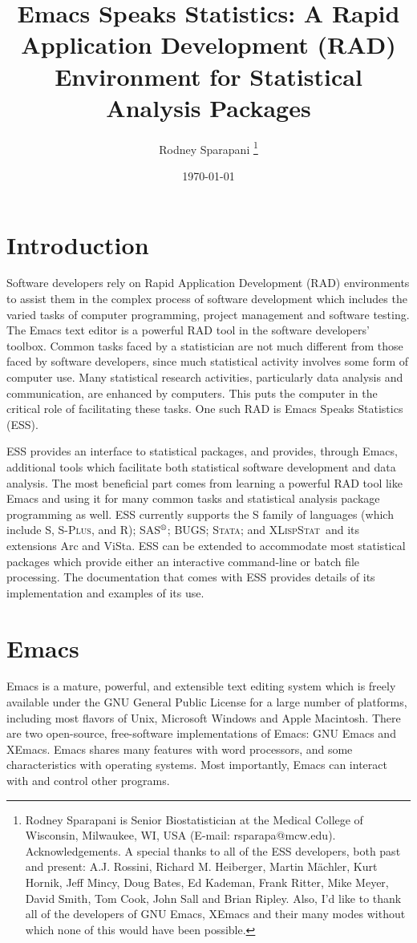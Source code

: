 \documentclass{article}
\title{Emacs Speaks Statistics:  A Rapid Application Development (RAD)
  Environment for Statistical Analysis Packages}
\author{Rodney Sparapani \footnote{%
Rodney Sparapani is Senior Biostatistician at the Medical College
of Wisconsin, Milwaukee, WI, USA (E-mail: rsparapa@mcw.edu).
Acknowledgements.  A special thanks to all of the ESS developers, both past
    and present:  A.J. Rossini, Richard M. Heiberger, Martin M{\"a}chler, 
    Kurt Hornik, Jeff Mincy, Doug Bates, Ed Kademan, Frank Ritter, Mike Meyer, 
    David Smith, Tom Cook, John Sall and Brian Ripley.  Also, I'd like to thank
    all of the developers of GNU Emacs, XEmacs and their many modes without which
    none of this would have been possible.}}
\date{\today}
\newcommand{\SAS}{\textsc{SAS}$^{\mbox{\scriptsize\textregistered}}$}
\newcommand{\Splus}{\textsc{S-Plus}}
\newcommand*{\XLispStat}{\textsc{XLispStat}}
\newcommand*{\Stata}{\textsc{Stata}}
\begin{document}
\maketitle

\section{Introduction}
\label{sec:introduction}

Software developers rely on Rapid Application Development (RAD)
environments to assist them in the complex process of software
development which includes the varied tasks of computer
programming, project management and software testing.  The Emacs text
editor is a powerful RAD tool in the software developers' toolbox.
Common tasks faced by a statistician are not much different from those
faced by software developers, since much statistical
activity involves some form of computer use.  Many
statistical research activities, particularly data analysis and
communication, are enhanced by computers.  This puts the computer
in the critical role of facilitating these
tasks.  One such RAD is Emacs Speaks Statistics (ESS).

ESS provides an interface to statistical packages, and provides,
through Emacs, additional tools which facilitate both statistical
software development and data analysis.  The most beneficial part  
comes from learning a powerful RAD tool like Emacs and using it for 
many common tasks and statistical analysis package programming as well. 
ESS currently supports the S family of languages (which include
S, \Splus, and R); \SAS;  BUGS; \Stata; and \XLispStat\
and its extensions Arc and ViSta.  ESS can be
extended to accommodate most statistical packages which provide either
an interactive command-line or batch file processing.  The documentation 
that comes with ESS provides details of its implementation and examples 
of its use.


\section{Emacs}
\label{sec:emacs}

Emacs is a mature, powerful, and extensible text editing system which
is freely available under the GNU General Public License for a large
number of platforms, including most flavors of Unix, Microsoft Windows
and Apple Macintosh.  There are two open-source, free-software
implementations of Emacs:  GNU Emacs and XEmacs.
Emacs shares many features with
word processors, and some characteristics with operating systems.
Most importantly, Emacs can interact with and control other programs.
\end{document}
